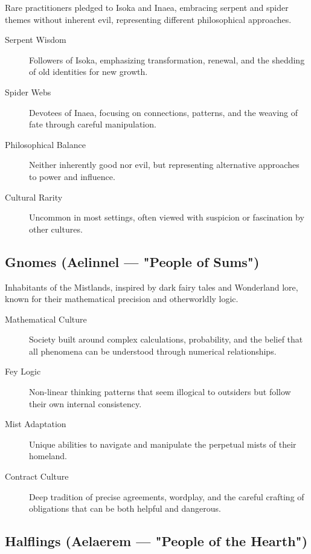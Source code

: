 Rare practitioners pledged to Isoka and Inaea, embracing serpent and spider themes without inherent evil, representing different philosophical approaches.

\begin{description}
\item[Serpent Wisdom] Followers of Isoka, emphasizing transformation, renewal, and the shedding of old identities for new growth.
\item[Spider Webs] Devotees of Inaea, focusing on connections, patterns, and the weaving of fate through careful manipulation.
\item[Philosophical Balance] Neither inherently good nor evil, but representing alternative approaches to power and influence.
\item[Cultural Rarity] Uncommon in most settings, often viewed with suspicion or fascination by other cultures.
\end{description}

\subsection*{Gnomes (Aelinnel — "People of Sums")}

Inhabitants of the Mistlands, inspired by dark fairy tales and Wonderland lore, known for their mathematical precision and otherworldly logic.

\begin{description}
\item[Mathematical Culture] Society built around complex calculations, probability, and the belief that all phenomena can be understood through numerical relationships.
\item[Fey Logic] Non-linear thinking patterns that seem illogical to outsiders but follow their own internal consistency.
\item[Mist Adaptation] Unique abilities to navigate and manipulate the perpetual mists of their homeland.
\item[Contract Culture] Deep tradition of precise agreements, wordplay, and the careful crafting of obligations that can be both helpful and dangerous.
\end{description}

\subsection*{Halflings (Aelaerem — "People of the Hearth")}

